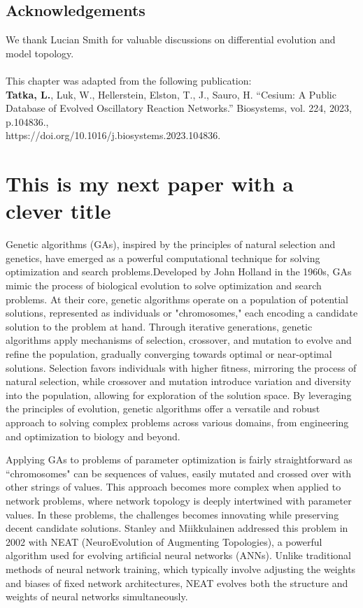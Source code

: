 \documentclass[12pt]{report}
\begin{document}
\section*{Acknowledgements}
We thank Lucian Smith for valuable discussions on differential evolution and model topology. 
\\
\\
This chapter was adapted from the following publication:
\\
\textbf{Tatka, L.}, Luk, W., Hellerstein, Elston, T., J., Sauro, H. “Cesium: A Public Database of Evolved Oscillatory Reaction Networks.”  Biosystems, vol. 224, 2023, p.104836., \\
https://doi.org/10.1016/j.biosystems.2023.104836. 
\\


\chapter{This is my next paper with a clever title}
Genetic algorithms (GAs), inspired by the principles of natural selection and genetics, have emerged as a powerful computational technique for solving optimization and search problems.Developed by John Holland in the 1960s, GAs mimic the process of biological evolution to solve optimization and search problems. At their core, genetic algorithms operate on a population of potential solutions, represented as individuals or "chromosomes," each encoding a candidate solution to the problem at hand. Through iterative generations, genetic algorithms apply mechanisms of selection, crossover, and mutation to evolve and refine the population, gradually converging towards optimal or near-optimal solutions. Selection favors individuals with higher fitness, mirroring the process of natural selection, while crossover and mutation introduce variation and diversity into the population, allowing for exploration of the solution space. By leveraging the principles of evolution, genetic algorithms offer a versatile and robust approach to solving complex problems across various domains, from engineering and optimization to biology and beyond.


Applying GAs to problems of parameter optimization is fairly straightforward as ``chromosomes" can be sequences of values, easily mutated and crossed over with other strings of values. This approach becomes more complex when applied to network problems, where network topology is deeply intertwined with parameter values. In these problems, the challenges becomes innovating while preserving decent candidate solutions. Stanley and Miikkulainen addressed this problem in 2002 with NEAT (NeuroEvolution of Augmenting Topologies), a powerful algorithm used for evolving artificial neural networks (ANNs). Unlike traditional methods of neural network training, which typically involve adjusting the weights and biases of fixed network architectures, NEAT evolves both the structure and weights of neural networks simultaneously.
\end{document}
